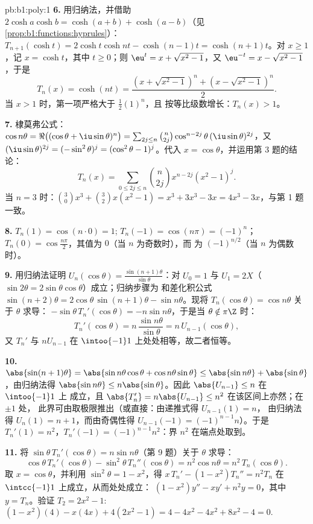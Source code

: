 \begin{solution}{pb:b1:poly:1}
\textbf{6.} 用归纳法，并借助 $2\cosh a\cosh b = \cosh(a + b) +
\cosh(a - b)$（见\cref{prop:b1:functions:hyprules}）：$T_{n+1}(\cosh
t) = 2\cosh t\cosh nt - \cosh(n-1)t = \cosh(n+1)t$。对 $x \geq
1$，记 $x = \cosh t$，其中 $t \geq 0$；则 $\eu^t = x +
\sqrt{x^2 - 1}$，又 $\eu^{-t} = x - \sqrt{x^2 - 1}$，于是
\[
T_n(x) = \cosh(nt)
= \frac{(x + \sqrt{x^2-1})^n + (x - \sqrt{x^2-1})^n}2 .
\]
当 $x > 1$ 时，第一项严格大于 $\frac12(1)^n$，且
按等比级数增长：$T_n(x) > 1$。

\textbf{7.} 棣莫弗公式：$\cos n\theta = \Re\bigl((\cos\theta +
\iu\sin\theta)^n\bigr) = \sum_{2j \leq n}\binom n{2j}
\cos^{n-2j}\theta\,(\iu\sin\theta)^{2j}$，又 $(\iu\sin\theta)^{2j}
= (-\sin^2\theta)^j = (\cos^2\theta - 1)^j$。代入 $x =
\cos\theta$，并运用第 3 题的结论：
\[
T_n(x) = \sum_{0\leq 2j\leq n}\binom n{2j}x^{n-2j}(x^2 - 1)^j .
\]
当 $n = 3$ 时：$\binom30 x^3 + \binom32 x(x^2 - 1) = x^3 + 3x^3 -
3x = 4x^3 - 3x$，与第 1 题一致。

\textbf{8.} $T_n(1) = \cos(n\cdot0) = 1$; $T_n(-1) = \cos(n\pi) =
(-1)^n$；$T_n(0) = \cos\frac{n\pi}2$，其值为 $0$（当 $n$ 为奇数时），而
为 $(-1)^{n/2}$（当 $n$ 为偶数时）。

\textbf{9.} 用归纳法证明 $U_n(\cos\theta) =
\frac{\sin(n+1)\theta}{\sin\theta}$：对 $U_0 = 1$ 与 $U_1 =
2X$（$\sin2\theta = 2\sin\theta\cos\theta$）成立；归纳步骤为
和差化积公式 $\sin(n+2)\theta = 2\cos\theta\,
\sin(n+1)\theta - \sin n\theta$。现将
$T_n(\cos\theta) = \cos n\theta$ 关于 $\theta$ 求导：
$-\sin\theta\,T_n'(\cos\theta) = -n\sin n\theta$，于是当 $\theta
\notin \pi\Z$ 时：
\[
T_n'(\cos\theta) = n\,\frac{\sin n\theta}{\sin\theta}
= n\,U_{n-1}(\cos\theta) ,
\]
又 $T_n'$ 与 $nU_{n-1}$ 在
$\intoo{-1}1$ 上处处相等，故二者恒等。

\textbf{10.} $\abs{\sin(n+1)\theta} = \abs{\sin n\theta\cos\theta
+ \cos n\theta\sin\theta} \leq \abs{\sin n\theta} +
\abs{\sin\theta}$，由归纳法得 $\abs{\sin n\theta} \leq
n\abs{\sin\theta}$。因此 $\abs{U_{n-1}} \leq n$ 在 $\intoo{-1}1$ 上
成立，且 $\abs{T_n'} = n\abs{U_{n-1}} \leq n^2$ 在该区间上亦然；在 $\pm1$ 处，
此界可由取极限推出（或直接：由递推式得 $U_{n-1}(1) = n$，
由归纳法得 $U_n(1) = n + 1$，而由奇偶性得
$U_{n-1}(-1) = (-1)^{n-1}n$）。于是 $T_n'(1) = n^2$，$T_n'(-1)
= (-1)^{n-1}n^2$：界 $n^2$ 在端点处取到。

\textbf{11.} 将 $\sin\theta\,T_n'(\cos\theta) = n\sin
n\theta$（第 9 题）关于 $\theta$ 求导：
\[
\cos\theta\,T_n'(\cos\theta) - \sin^2\theta\,T_n''(\cos\theta)
= n^2\cos n\theta = n^2\,T_n(\cos\theta) .
\]
取 $x = \cos\theta$，并利用 $\sin^2\theta = 1 - x^2$，得 $x\,T_n' - (1
- x^2)T_n'' = n^2T_n$ 在 $\intcc{-1}1$ 上成立，从而处处成立：
$(1 - x^2)y'' - xy' + n^2y = 0$，其中 $y = T_n$。验证 $T_2 =
2x^2 - 1$: $(1 - x^2)(4) - x(4x) + 4(2x^2 - 1) = 4 - 4x^2 - 4x^2
+ 8x^2 - 4 = 0$.


\end{solution}
